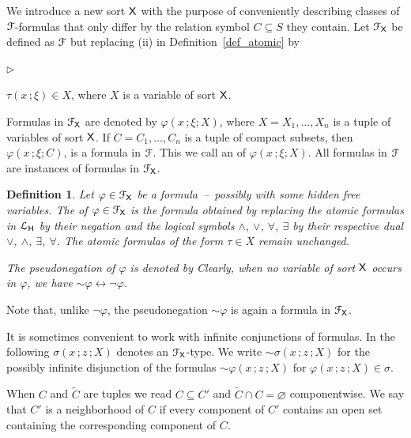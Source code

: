 \documentclass{amsproc}
\newcommand{\mylabel}[1]{{#1}\hfill}
\renewenvironment{itemize}
  {\begin{list}{$\triangleright$}{%
  \setlength{\parskip}{0mm}
  \setlength{\topsep}{.1\baselineskip}
  \setlength{\rightmargin}{0mm}
  \setlength{\listparindent}{0mm}
  \setlength{\itemindent}{0mm}
  \setlength{\labelwidth}{3ex}
  \setlength{\itemsep}{.1\baselineskip}
  \setlength{\parsep}{.1\baselineskip}
  \setlength{\partopsep}{0mm}
  \setlength{\labelsep}{1ex}
  \setlength{\leftmargin}{\labelwidth+\labelsep}
  \let\makelabel\mylabel}}{%
\end{list}}
\newcounter{thm}
\theoremstyle{mio}
\newtheorem{definition}[thm]{Definition}\tcolorboxenvironment{definition}{mythm}
\renewcommand*{\emph}[1]{%
   \smash{\tikz[baseline]\node[rectangle, fill=teal!25, rounded corners, inner xsep=0.5ex, inner ysep=0.2ex, anchor=base, minimum height = 2.7ex]{\strut #1};}}
\begin{document}
We introduce a new sort ${\sf X}$ with the purpose of conveniently describing classes of ${\EuScript F}$-for\-mulas that only differ by the relation symbol $C\subseteq S$ they contain.
Let ${\EuScript F}_{\sf X}$ be defined as ${\EuScript F}$ but replacing (ii) in Definition~\ref{def_atomic} by\smallskip

\begin{itemize}
  \item[iii.] $\tau(x\,;\xi)\in X$, where $X$ is a variable of sort ${\sf X}$.
\end{itemize}

Formulas in ${\EuScript F}_{\sf X}$ are denoted by $\varphi(x\,;\xi;X)$, where $X=X_1,\dots,X_n$ is a tuple of variables of sort ${\sf X}$.
If $C=C _1,\dots,C_n$ is a tuple of compact subsets, then $\varphi(x\,;\xi;C)$, is a formula in ${\EuScript F}$.
This we call an \emph{instance\/} of $\varphi(x\,;\xi;X)$.
All formulas in ${\EuScript F}$ are instances of formulas in ${\EuScript F}_{\sf X}$.

\begin{definition}
  Let $\varphi\in{\EuScript F}_{\sf X}$ be a formula~--~possibly with some hidden free variables.
  The \emph{pseudonegation\/} of $\varphi\in{\EuScript F}_{\sf X}$ is the formula obtained by replacing the atomic formulas in  ${\EuScript L}_{\sf H}$ by their negation and the logical symbols $\wedge$, $\vee$, $\forall$, $\exists$
  by their respective dual $\vee$, $\wedge$, $\exists$, $\forall$.
  The atomic formulas of the form $\tau\in X$ remain unchanged.\smallskip
  
The pseudonegation of $\varphi$ is denoted by \emph{${\sim}\varphi$.}
Clearly, when no variable of sort ${\sf X}$ occurs in $\varphi$, we have ${\sim}\varphi\leftrightarrow\neg\varphi$.
\end{definition}

Note that, unlike $\neg\varphi$, the pseudonegation ${\sim}\varphi$ is again a formula in ${\EuScript F}_{\sf X}$.

It is sometimes convenient to work with infinite conjunctions of formulas.
In the following $\sigma(x\,;z\,;X)$ denotes an ${\EuScript F}_{\sf X}$-type.
We write ${\sim}\sigma(x\,;z\,;X)$ for the possibly infinite disjunction of the formulas ${\sim}\varphi(x\,;z\,;X)$ for $\varphi(x\,;z\,;X)\in\sigma$.

When $C$ and $\tilde C$ are tuples we read $C\subseteq C'$ and $\tilde C\cap C=\varnothing$ componentwise.
We say that $C'$ is a neighborhood of $C$ if every component of $C'$ contains an open set containing the corresponding component of $C$.
\end{document}
